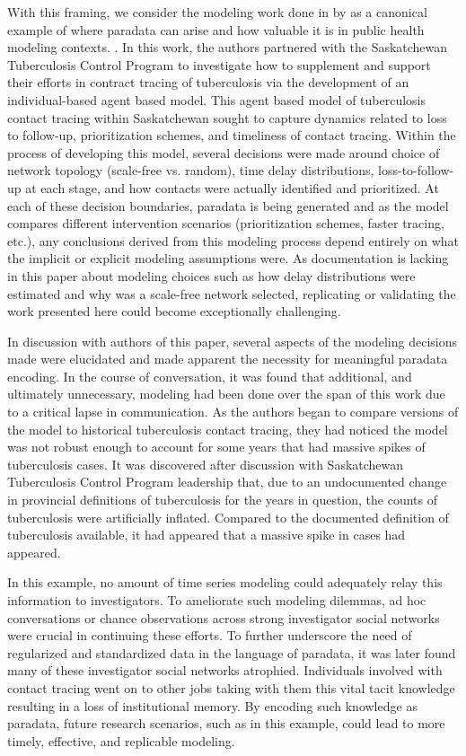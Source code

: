 With this framing, we consider the modeling work done in   by \citeauthor{tian_evaluating_2013} as a canonical example of where paradata can arise and how valuable it is in public health modeling contexts.  \cite{tian_evaluating_2013}. 
In this work, the authors partnered with the Saskatchewan Tuberculosis Control Program to investigate how to supplement and support their efforts in contract tracing of tuberculosis via the development of an individual-based agent based model.
This agent based model of tuberculosis contact tracing within Saskatchewan sought to capture dynamics related to loss to follow-up, prioritization schemes, and timeliness of contact tracing.
Within the process of developing this model, several decisions were made around choice of network topology (scale-free vs. random), time delay distributions, loss-to-follow-up at each stage, and how contacts were actually identified and prioritized.
At each of these decision boundaries, paradata is being generated and as the model compares different intervention scenarios (prioritization schemes, faster tracing, etc.), any conclusions derived from this modeling process depend entirely on what the implicit or explicit modeling assumptions were.
As documentation is lacking in this paper about modeling choices such as how delay distributions were estimated and why was a scale-free network selected, replicating or validating the work presented here could become exceptionally challenging.

In discussion with authors of this paper, several aspects of the modeling decisions made were elucidated and made apparent the necessity for meaningful paradata encoding.
In the course of conversation, it was found that additional, and ultimately unnecessary, modeling had been done over the span of this work due to a critical lapse in communication.
As the authors began to compare versions of the model to historical tuberculosis contact tracing, they had noticed the model was not robust enough to account for some years that had massive spikes of tuberculosis cases.
It was discovered after discussion with Saskatchewan Tuberculosis Control Program leadership that, due to an undocumented change in provincial definitions of tuberculosis for the years in question, the counts of tuberculosis were artificially inflated.
Compared to the documented definition of tuberculosis available, it had appeared that a massive spike in cases had appeared.

In this example, no amount of time series modeling could adequately relay this information to investigators.
To ameliorate such modeling dilemmas, ad hoc conversations or chance observations across strong investigator social networks were crucial in continuing these efforts. 
To further underscore the need of regularized and standardized data in the language of paradata, it was later found many of these investigator social networks atrophied.
Individuals involved with contact tracing went on to other jobs taking with them this vital tacit knowledge resulting in a loss of institutional memory.
By encoding such knowledge as paradata, future research scenarios, such as in this example, could lead to more timely, effective, and replicable modeling.

